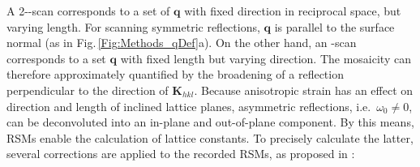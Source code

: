 A 2\texttheta-\textomega-scan corresponds to a set of $\mathbf{q}$ with fixed direction in reciprocal space, but varying length.
For scanning symmetric reflections, $\mathbf{q}$ is parallel to the surface normal (as in Fig.\,\ref{Fig:Methods_qDef}a).
On the other hand, an \textomega-scan corresponds to a set $\mathbf{q}$ with fixed length but varying direction.
The mosaicity can therefore approximately quantified by the broadening of a reflection perpendicular to the direction of $\mathbf{K}_{hkl}$.
Because anisotropic strain has an effect on direction and length of inclined lattice planes, asymmetric reflections, i.e.\ $\omega_0\neq0$, can be deconvoluted into an in-plane and out-of-plane component.
By this means, \glspl{RSM} enable the calculation of lattice constants.
To precisely calculate the latter, several corrections are applied to the recorded \glspl{RSM}, as proposed in \textcite{kneiss2021}:
